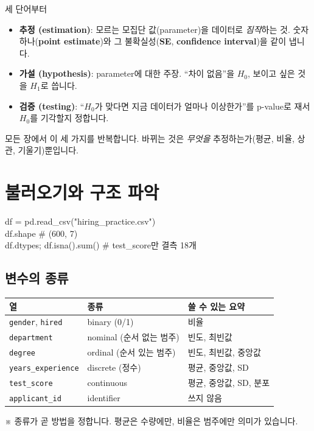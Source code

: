 \documentclass[11pt,a4paper]{article}
\newcommand{\term}[1]{\textbf{#1}}
\newcommand{\code}[1]{\texttt{#1}}
\newcommand{\aside}[1]{{\footnotesize\color{black!65}#1}}
\begin{document}
\begin{keybox}{세 단어부터}
\begin{itemize}
\item \term{추정 (estimation)}: 모르는 모집단 값(parameter)을 데이터로 \emph{짐작}하는 것. 숫자 하나(\term{point estimate})와 그 불확실성(\term{SE}, \term{confidence interval})을 같이 냅니다.
\item \term{가설 (hypothesis)}: parameter에 대한 주장. ``차이 없음''을 $H_0$, 보이고 싶은 것을 $H_1$로 씁니다.
\item \term{검증 (testing)}: ``$H_0$가 맞다면 지금 데이터가 얼마나 이상한가''를 p-value로 재서 $H_0$를 기각할지 정합니다.
\end{itemize}
모든 장에서 이 세 가지를 반복합니다. 바뀌는 것은 \emph{무엇을} 추정하는가(평균, 비율, 상관, 기울기)뿐입니다.
\end{keybox}

\clearpage
\clearpage

\clearpage
\renewcommand{\contentsname}{목차 (Contents)}
\tableofcontents

\section{불러오기와 구조 파악}

\begin{codebox}
df = pd.read\_csv("hiring\_practice.csv")\\
df.shape \hfill \# (600, 7)\\
df.dtypes; df.isna().sum() \hfill \# test\_score만 결측 18개
\end{codebox}

\subsection{변수의 종류}
\begin{center}
\begin{tabular}{@{}l l l@{}}
\toprule
열 & 종류 & 쓸 수 있는 요약 \\
\midrule
\code{gender}, \code{hired} & binary (0/1) & 비율 \\
\code{department} & nominal (순서 없는 범주) & 빈도, 최빈값 \\
\code{degree} & ordinal (순서 있는 범주) & 빈도, 최빈값, 중앙값 \\
\code{years\_experience} & discrete (정수) & 평균, 중앙값, SD \\
\code{test\_score} & continuous & 평균, 중앙값, SD, 분포 \\
\code{applicant\_id} & identifier & 쓰지 않음 \\
\bottomrule
\end{tabular}
\end{center}
\aside{※ 종류가 곧 방법을 정합니다. 평균은 수량에만, 비율은 범주에만 의미가 있습니다.}
\end{document}
